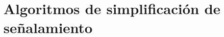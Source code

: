 \section{Algoritmos de simplificación de señalamiento}
    \label{sec:simplificacion}
\lipsum[1]




